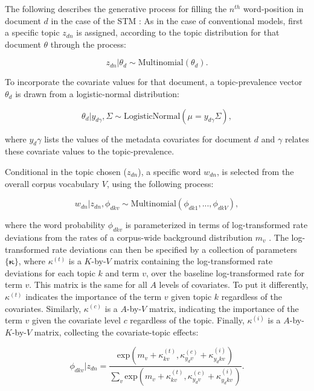 \documentclass[12pt,a4paper,notitlepage]{article}
\begin{document}
 The following describes the generative process for filling the $n^{th}$ word-position in document $d$ in the case of the STM \citep{roberts_structural_2013}: As in the case of conventional models, first a specific topic $z_{dn}$ is assigned, according to the topic distribution for that document $\theta$ through the process:

\begin{equation}
	z_{dn}|\theta_d \sim \textrm{Multinomial}(\theta_d).
\end{equation}

To incorporate the covariate values for that document, a topic-prevalence vector $\theta_d$ is drawn from a logistic-normal distribution:

\begin{equation}
	\theta_d|y_{d\gamma},\Sigma \sim \textrm{LogisticNormal}(\mu = y_{d\gamma}\Sigma),
\end{equation}

where $y_d\gamma$ lists the values of the metadata covariates for document $d$ and $\gamma$ relates these covariate values to the topic-prevalence. 

Conditional in the topic chosen ($z_{dn}$), a specific word $w_{dn}$, is selected from the overall corpus vocabulary $V$, using the following process:

\begin{equation}
	w_{dn}|z_{dn},\phi_{dkv} \sim \textrm{Multinomial}(\phi_{dk1},...,\phi_{dkV}),
\end{equation}

where the word probability $\phi_{dkv}$ is parameterized in terms of log-transformed rate deviations from the rates of a corpus-wide background distribution $m_v$ \citep{roberts_structural_2013}. The log-transformed rate deviations can then be specified by a collection of parameters $\lbrace \boldsymbol{\kappa} \rbrace$, where $\kappa^{(t)}$ is a $K$-by-$V$ matrix containing the log-transformed rate deviations for each topic $k$ and term $v$, over the baseline log-transformed rate for term $v$. This matrix is the same for all $A$ levels of covariates. To put it differently, $\kappa^{(t)}$ indicates the importance of the term $v$ given topic $k$ regardless of the covariates. Similarly, $\kappa^{(c)}$ is a $A$-by-$V$ matrix, indicating the importance of the term $v$ given the covariate level $c$ regardless of the topic. Finally, $\kappa^{(i)}$ is a $A$-by-$K$-by-$V$ matrix, collecting the covariate-topic effects:

\begin{equation}
	\phi_{dkv}|z_{dn}=\frac{\textrm{exp}(m_v+\kappa^{(t)}_{kv},\kappa^{(c)}_{y_dv}+\kappa^{(i)}_{y_dkv})}{\sum_v \textrm{exp}(m_v+\kappa^{(t)}_{kv},\kappa^{(c)}_{y_dv}+\kappa^{(i)}_{y_dkv})}.
\end{equation}
\end{document}
